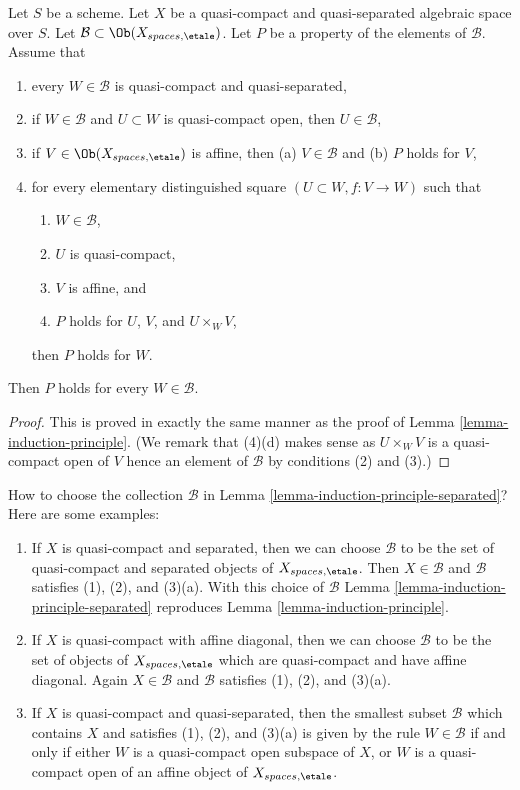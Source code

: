 \begin{lemma}
\label{lemma-induction-principle-separated}
Let $S$ be a scheme. Let $X$ be a quasi-compact and quasi-separated
algebraic space over $S$. Let
$\mathcal{B} \subset \Ob(X_{spaces, \etale})$.
Let $P$ be a property of the elements of $\mathcal{B}$.
Assume that
\begin{enumerate}
\item every $W \in \mathcal{B}$ is quasi-compact and quasi-separated,
\item if $W \in \mathcal{B}$ and $U \subset W$ is quasi-compact open, then
$U \in \mathcal{B}$,
\item if $V \in \Ob(X_{spaces, \etale})$ is affine, then
(a) $V \in \mathcal{B}$ and (b) $P$ holds for $V$,
\item for every elementary distinguished square $(U \subset W, f : V \to W)$
such that
\begin{enumerate}
\item $W \in \mathcal{B}$,
\item $U$ is quasi-compact,
\item $V$ is affine, and
\item $P$ holds for $U$, $V$, and $U \times_W V$,
\end{enumerate}
then $P$ holds for $W$.
\end{enumerate}
Then $P$ holds for every $W \in \mathcal{B}$.
\end{lemma}

\begin{proof}
This is proved in exactly the same manner as the proof of
Lemma \ref{lemma-induction-principle}.
(We remark that (4)(d) makes sense as $U \times_W V$ is a quasi-compact
open of $V$ hence an element of $\mathcal{B}$ by conditions
(2) and (3).)
\end{proof}

\begin{remark}
\label{remark-how-to}
How to choose the collection $\mathcal{B}$ in
Lemma \ref{lemma-induction-principle-separated}?
Here are some examples:
\begin{enumerate}
\item If $X$ is quasi-compact and separated, then we can choose
$\mathcal{B}$ to be the set of quasi-compact and separated objects
of $X_{spaces, \etale}$. Then $X \in \mathcal{B}$ and $\mathcal{B}$
satisfies (1), (2), and (3)(a). With this choice of $\mathcal{B}$
Lemma \ref{lemma-induction-principle-separated} reproduces
Lemma \ref{lemma-induction-principle}.
\item If $X$ is quasi-compact with affine diagonal, then we can choose
$\mathcal{B}$ to be the set of objects
of $X_{spaces, \etale}$ which are quasi-compact and have affine
diagonal. Again $X \in \mathcal{B}$ and $\mathcal{B}$
satisfies (1), (2), and (3)(a).
\item If $X$ is quasi-compact and quasi-separated, then the
smallest subset $\mathcal{B}$ which contains $X$ and satisfies
(1), (2), and (3)(a) is given by the rule $W \in \mathcal{B}$ if and only
if either $W$ is a quasi-compact open subspace of $X$, or
$W$ is a quasi-compact open of an affine object of $X_{spaces, \etale}$.
\end{enumerate}
\end{remark}


